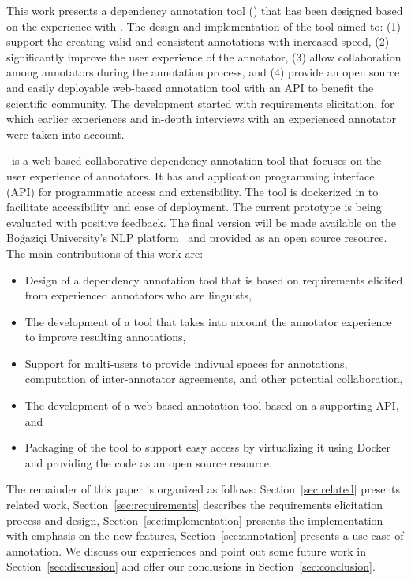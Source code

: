 This work presents a dependency annotation tool (\boatvtwo) that has been designed based on the experience with \boatvone.
The design and implementation of the tool aimed to: (1) support the creating valid and consistent annotations with increased speed, (2) significantly improve the user experience of the annotator, (3) allow collaboration among annotators during the annotation process, and (4) provide an open source and easily deployable web-based annotation tool with an API to benefit the scientific community.
The development started with requirements elicitation, for which earlier experiences and in-depth interviews with an experienced annotator were taken into account.

\boatvtwo\ is a web-based collaborative dependency annotation tool that focuses on the user experience of annotators. 
It has and application programming interface (API) for programmatic access and extensibility. 
The tool is dockerized in to facilitate accessibility and ease of  deployment.
The current prototype is being evaluated with positive feedback.
The final version will be made available on the Boğaziçi University's NLP platform~\cite{DIP} and provided as an open source resource.
The main contributions of this work are:
\begin{itemize}
\setlength\itemsep{0em}
        \item Design of a dependency annotation tool that is based on requirements elicited from experienced annotators who are linguists,
        \item The development of a tool that takes into account the annotator experience to improve resulting annotations,
        \item Support for multi-users to provide indivual spaces for annotations, computation of inter-annotator agreements, and other potential collaboration,
        \item The development of a web-based annotation tool based on a supporting API, and
        \item Packaging of the tool to support easy access by virtualizing it using Docker and providing the code as an open source resource.
\end{itemize}

The remainder of this paper is organized as follows:
Section~\ref{sec:related} presents related work,
Section~\ref{sec:requirements} describes the requirements elicitation process and design,
Section~\ref{sec:implementation} presents the implementation with emphasis on the new features,
Section~\ref{sec:annotation} presents a use case of annotation.
We discuss our experiences and point out some future work in Section~\ref{sec:discussion} and offer our conclusions  in Section~\ref{sec:conclusion}.
